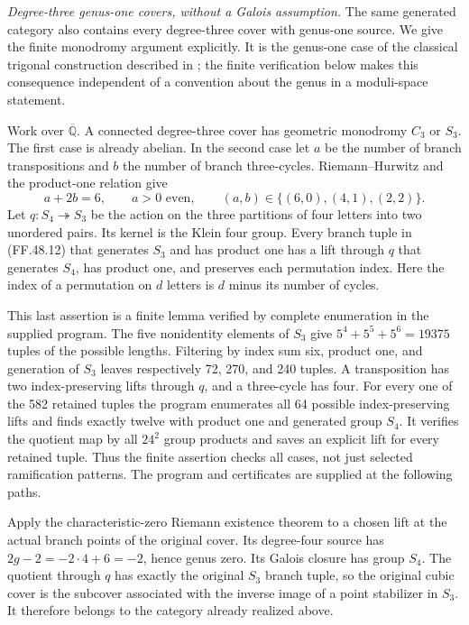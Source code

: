 \emph{Degree-three genus-one covers, without a Galois assumption.}
The same generated category also contains every degree-three
cover with genus-one source. We give the finite monodromy
argument explicitly. It is the genus-one case of the
classical trigonal construction described in
\citet[Section~9.1, Remark~9.13]{FF_RecillasRodriguez2003};
the finite verification below makes this consequence
independent of a convention about the genus in a
moduli-space statement.

Work over \(\overline{\mathbb Q}\). A connected
degree-three cover has geometric monodromy \(C_3\)
or \(S_3\). The first case is already abelian.
In the second case let \(a\) be the number of branch
transpositions and \(b\) the number of branch
three-cycles. Riemann--Hurwitz and the product-one
relation give
\[
          a+2b=6,\qquad a>0\text{ even},\qquad
          (a,b)\in\{(6,0),(4,1),(2,2)\}.
                                                        \tag{FF.48.12}
\]
Let \(q:S_4\twoheadrightarrow S_3\) be the action
on the three partitions of four letters into two
unordered pairs. Its kernel is the Klein four group.
Every branch tuple in (FF.48.12) that generates
\(S_3\) and has product one has a lift through
\(q\) that generates \(S_4\), has product one,
and preserves each permutation index. Here the index
of a permutation on \(d\) letters is \(d\) minus
its number of cycles.

This last assertion is a finite lemma verified by
complete enumeration in the supplied program. The
five nonidentity elements of \(S_3\) give
\(5^4+5^5+5^6=19375\) tuples of the possible
lengths. Filtering by index sum six, product one,
and generation of \(S_3\) leaves respectively
72, 270, and 240 tuples. A transposition has two
index-preserving lifts through \(q\), and a
three-cycle has four. For every one of the 582
retained tuples the program enumerates all 64
possible index-preserving lifts and finds exactly
twelve with product one and generated group
\(S_4\). It verifies the quotient map by all
\(24^2\) group products and saves an explicit
lift for every retained tuple. Thus the finite
assertion checks all cases, not just selected
ramification patterns. The program and certificates
are supplied at the following paths.



Apply the characteristic-zero Riemann existence
theorem to a chosen lift at the actual branch
points of the original cover. Its degree-four
source has
\(2g-2=-2\cdot4+6=-2\), hence genus zero.
Its Galois closure has group \(S_4\). The quotient
through \(q\) has exactly the original
\(S_3\) branch tuple, so the original cubic
cover is the subcover associated with the inverse
image of a point stabilizer in \(S_3\).
It therefore belongs to the category already
realized above.

